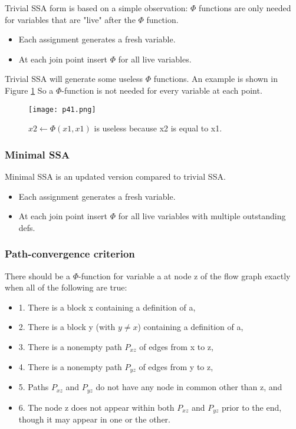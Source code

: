 Trivial SSA form is based on a simple observation: $\Phi$ functions are only needed for variables that are "live" after the $\Phi$ function.

\begin{itemize}
	\item Each assignment generates a fresh variable.
	\item At each join point insert $\Phi$ for all live variables.
\end{itemize}


Trivial SSA will generate some useless $\Phi$ functions. An example is shown in Figure \ref{fig:p41} So a $\Phi$-function is not needed for every variable at each point.

\begin{figure}[htb]
	\centering
	\texttt{[image: p41.png]}
	\caption{$x2 \leftarrow \Phi(x1,x1)$ is useless because x2 is equal to x1.}
	\label{fig:p41}

\end{figure}



\subsubsection{Minimal SSA}
Minimal SSA is an updated version compared to trivial SSA.

\begin{itemize}
	\item Each assignment generates a fresh variable.
	\item At each join point insert $\Phi$ for all live variables with multiple outstanding defs.
\end{itemize}

\subsubsection{Path-convergence criterion}

There should be a $\Phi$-function for variable a at node z of the flow graph
exactly when all of the following are true:

\begin{itemize}
	\item 1. There is a block x containing a definition of a,
	\item 2. There is a block y (with $y \neq x$) containing a definition of a,
	\item 3. There is a nonempty path $P_{xz}$ of edges from x to z,
	\item 4. There is a nonempty path $P_{yz}$ of edges from y to z,
	\item 5. Paths $P_{xz}$ and $P_{yz}$ do not have any node in common other than z, and
	\item 6. The node z does not appear within both $P_{xz}$ and $P_{yz}$ prior to the
	      end, though it may appear in one or the other.
\end{itemize}


